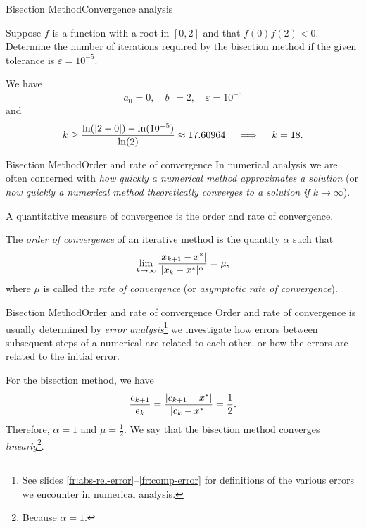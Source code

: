 \documentclass[12pt,aspectratio=169,envcountset]{beamer}
\DeclarePairedDelimiter{\abs}{\lvert}{\rvert}
\begin{document}
\begin{frame}{Bisection Method}{Convergence analysis}
  \begin{example}
    Suppose $f$ is a function with a root in $[0,2]$ and that $f(0)f(2) < 0$.
    Determine the number of iterations required by the bisection method if the
    given tolerance is $\varepsilon = 10^{-5}$.
  \end{example}
  We have
  \[
    a_0 = 0, \quad
    b_0 = 2, \quad
    \varepsilon = 10^{-5}
  \]
  and
  \[
    k \geq \frac{\ln(\abs{2 - 0}) - \ln(10^{-5})}{\ln(2)} \approx 17.60964
    \quad \implies \quad
    k = 18.
  \]
\end{frame}

\begin{frame}{Bisection Method}{Order and rate of convergence}
  In numerical analysis we are often concerned with \emph{how quickly a
  numerical method approximates a solution} (or \emph{how quickly a numerical
  method theoretically converges to a solution if $k \to \infty$}).

  A quantitative measure of convergence is the order and rate of convergence.
  \begin{definition}
    The \emph{order of convergence} of an iterative method is the quantity
    $\alpha$ such that
    \begin{equation} \label{eq:convergence-order-rate-def}
      \lim_{k\to\infty} \frac{\abs{x_{k+1} - x^*}}{\abs{x_k - x^*}^\alpha} =
      \mu,
    \end{equation}
    where $\mu$ is called the \emph{rate of convergence} (or \emph{asymptotic
    rate of convergence}).
  \end{definition}
\end{frame}

\begin{frame}{Bisection Method}{Order and rate of convergence}
  Order and rate of convergence is usually determined by \emph{error
  analysis}\footnote{See slides \ref{fr:abs-rel-error}--\ref{fr:comp-error} for
  definitions of the various errors we encounter in numerical analysis.}
  we investigate how errors between subsequent steps of a numerical are related
  to each other, or how the errors are related to the initial error.

  For the bisection method, we have
  \[
    \frac{e_{k+1}}{e_k}
    =\frac{\abs{c_{k+1} - x^*}}{\abs{c_k - x^*}} = \frac{1}{2}.
  \]
  Therefore, $\alpha = 1$ and $\mu = \frac{1}{2}$.
  We say that the bisection method converges \emph{linearly}\footnote{Because $\alpha =
  1$.}.
\end{frame}
\end{document}
